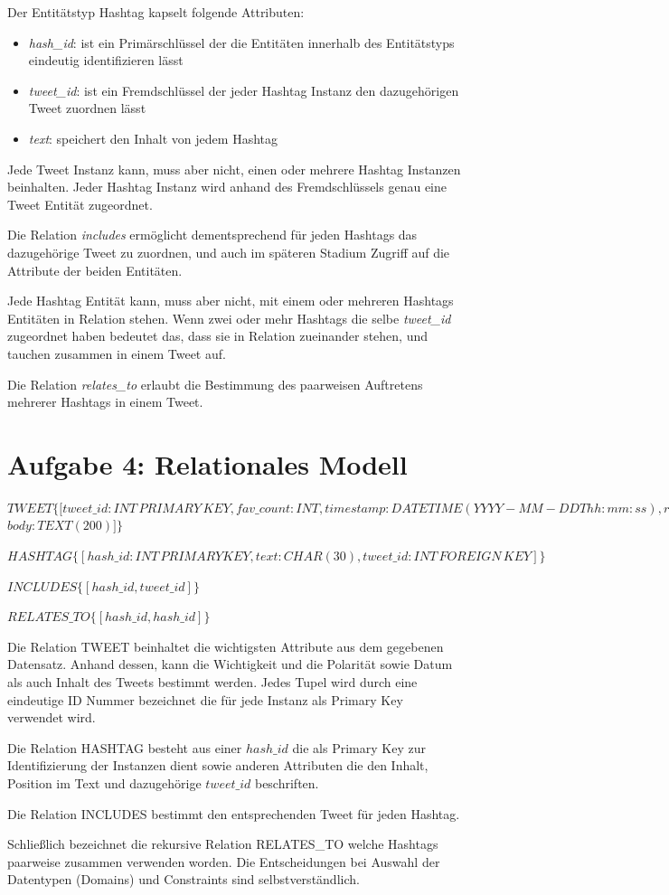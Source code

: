 \documentclass[12pt]{article}
\begin{document}
Der Entitätstyp Hashtag kapselt folgende Attributen:
\begin{itemize}
\item \textit{hash\_id}: ist ein Primärschlüssel der die Entitäten innerhalb des Entitätstyps eindeutig identifizieren lässt
\item \textit{tweet\_id}: ist ein Fremdschlüssel der jeder Hashtag Instanz den dazugehörigen Tweet zuordnen lässt
\item \textit{text}: speichert den Inhalt von jedem Hashtag
\end{itemize}

Jede Tweet Instanz kann, muss aber nicht, einen oder mehrere Hashtag Instanzen beinhalten. Jeder Hashtag Instanz wird anhand des Fremdschlüssels genau eine Tweet Entität zugeordnet.

Die Relation \textit{includes} ermöglicht dementsprechend für jeden Hashtags das dazugehörige Tweet zu zuordnen, und auch im späteren Stadium Zugriff auf die Attribute der beiden Entitäten.

Jede Hashtag Entität kann, muss aber nicht, mit einem oder mehreren Hashtags Entitäten in Relation stehen. Wenn zwei oder mehr Hashtags die selbe \textit{tweet\_id} zugeordnet haben bedeutet das, dass sie in Relation zueinander stehen, und tauchen zusammen in einem Tweet auf.

Die Relation \textit{relates\_to} erlaubt die Bestimmung des paarweisen Auftretens mehrerer Hashtags in einem Tweet.
 

\section*{Aufgabe 4: Relationales Modell}
$TWEET \{[tweet\_id:INT\, PRIMARY\, KEY, fav\_count:INT, timestamp:DATETIME(YYYY-MM-DDThh:mm:ss), retweet\_count:INT,$ 
$ body:TEXT(200)] \}$

$HASHTAG\{[hash\_id:INT\, PRIMARY KEY, text:CHAR(30), tweet\_id:INT\, FOREIGN\, KEY]\} $
      
$INCLUDES\{[hash\_id, tweet\_id]\}$
          
$RELATES\_TO\{[hash\_id, hash\_id]\}$


Die Relation TWEET beinhaltet die wichtigsten Attribute aus dem gegebenen Datensatz. Anhand dessen, kann die Wichtigkeit und die Polarität sowie Datum als auch Inhalt des Tweets bestimmt werden.
Jedes Tupel wird durch eine eindeutige ID Nummer bezeichnet die für jede Instanz als Primary Key verwendet wird.

Die Relation HASHTAG besteht aus einer $hash\_id$ die als Primary Key zur Identifizierung der Instanzen dient sowie anderen Attributen die den Inhalt, Position im Text und dazugehörige $tweet\_id$ beschriften.

Die Relation INCLUDES bestimmt den entsprechenden Tweet für jeden Hashtag.
    

Schließlich bezeichnet die rekursive Relation RELATES\_TO welche Hashtags paarweise zusammen verwenden worden.
Die Entscheidungen bei Auswahl der Datentypen (Domains) und Constraints sind selbstverständlich.
\end{document}
